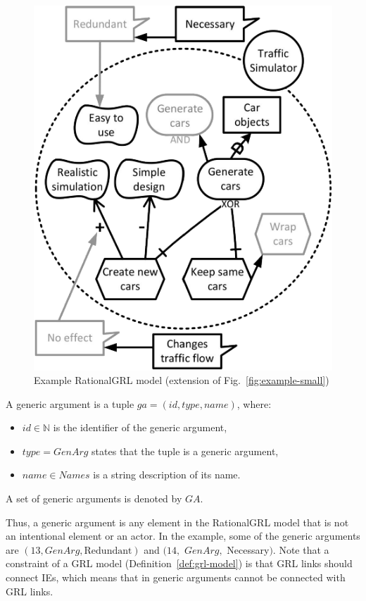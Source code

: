 \begin{figure}[b]
\centering
\includegraphics[width=\columnwidth]{img/Example1-new-attack.pdf}
\caption{Example RationalGRL model (extension of Fig.~\ref{fig:example-small})}
\label{fig:example-small3}
\end{figure} 

\begin{definition}
\label{def:generic-argument}
A generic argument is a tuple $ga=(id, type, name)$, where:
\begin{itemize}
\item $id\in \mathbb{N}$ is the identifier of the generic argument,
\item $type = GenArg$ states that the tuple is a generic argument,
\item $name\in Names$ is a string description of its name.
\end{itemize}
A set of generic arguments is denoted by $GA$.
\end{definition}

Thus, a generic argument is any element in the RationalGRL model that is not an intentional element or an actor. In the example, some of the generic arguments are $(13, GenArg, \text{Redundant})$ and $(14,$ $GenArg,$ Necessary$)$. Note that a constraint of a GRL model (Definition~\ref{def:grl-model}) is that GRL links should connect IEs, which means that in generic arguments cannot be connected with GRL links. 
 
